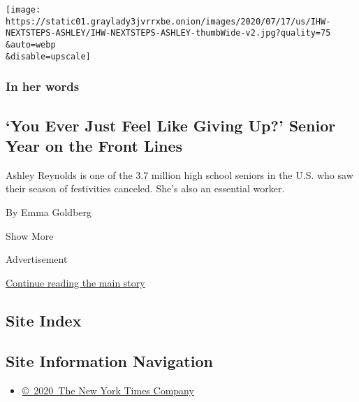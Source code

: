 \begin{enumerate}
  \texttt{[image: https://static01.graylady3jvrrxbe.onion/images/2020/07/17/us/IHW-NEXTSTEPS-ASHLEY/IHW-NEXTSTEPS-ASHLEY-thumbWide-v2.jpg?quality=75\\\&auto=webp\\\&disable=upscale]}

  \hypertarget{in-her-words-4}{%
  \subsubsection{In her words}\label{in-her-words-4}}

  \hypertarget{you-ever-just-feel-like-giving-up-senior-year-on-the-front-lines}{%
  \subsection{`You Ever Just Feel Like Giving Up?' Senior Year on the
  Front
  Lines}\label{you-ever-just-feel-like-giving-up-senior-year-on-the-front-lines}}

  Ashley Reynolds is one of the 3.7 million high school seniors in the
  U.S. who saw their season of festivities canceled. She's also an
  essential worker.

  By Emma Goldberg
\end{enumerate}

Show More

Advertisement

\protect\hyperlink{after-mid2}{Continue reading the main story}

\hypertarget{site-index}{%
\subsection{Site Index}\label{site-index}}

\hypertarget{site-information-navigation}{%
\subsection{Site Information
Navigation}\label{site-information-navigation}}

\begin{itemize}
\tightlist
\item
  \href{https://help.nytimes3xbfgragh.onion/hc/en-us/articles/115014792127-Copyright-notice}{©~2020~The
  New York Times Company}
\end{itemize}

